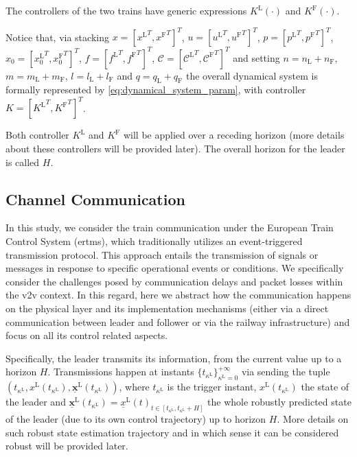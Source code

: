 \documentclass[letterpaper, 10 pt, conference]{ieeeconf}
\theoremstyle{definition}
\theoremstyle{nopoint}
\begin{document}
The controllers of the two trains have generic expressions $K^\mathrm{L}(\cdot)$ and $K^\mathrm{F}(\cdot)$.


Notice that, via stacking $x=[{x^\mathrm{L}}^T, {x^\mathrm{F}}^T]^T$, $u=[{u^\mathrm{L}}^T, {u^\mathrm{F}}^T]^T$, $p=[{p^\mathrm{L}}^T, {p^\mathrm{F}}^T]^T$, $x_0=[{x_0^\mathrm{L}}^T, {x_0^\mathrm{F}}^T]^T$, $f=[{f^\mathrm{L}}^T, {f^\mathrm{F}}^T]^T$, $\mathcal{C}=[{\mathcal{C^\mathrm{L}}}^T, {\mathcal{C^\mathrm{F}}}^T]^T$ and setting $n=n_\mathrm{L}+n_\mathrm{F}$, $m=m_\mathrm{L}+m_\mathrm{F}$, $l=l_\mathrm{L}+l_\mathrm{F}$ and $q=q_\mathrm{L}+q_\mathrm{F}$ the overall dynamical system is formally represented by \eqref{eq:dynamical_system_param}, with controller $K=[{K^\mathrm{L}}^T, {K^\mathrm{F}}^T]^T$. 

Both controller $K^\mathrm{L}$ and $K^\mathrm{F}$ will be applied over a receding horizon (more details about these controllers will be provided later). The overall horizon for the leader is called $H$.



%
\subsection{Channel Communication}
\label{subsec:transmissionEvent}


In this study, we consider the train communication {under} the European Train Control System (\gls{ertms}), {which traditionally} utilizes an event-triggered transmission protocol. This approach entails the transmission of signals or messages in response to specific operational events or conditions. We specifically consider the challenges posed by communication delays and packet losses within the \gls{v2v} context.
In this regard, here we abstract how the communication happens on the physical layer and its implementation mechanisms (either via a direct communication between leader and follower or via the railway infrastructure) and focus on all its control related aspects.


Specifically, the leader transmits its information, from the current value up to a horizon \(H\). Transmissions happen at instants \(\{ t_{\kappa^\mathrm{L}} \}_{\kappa^\mathrm{L}=0}^{+\infty}\) via sending the tuple $\left ( t_{\kappa^\mathrm{L}}, x^\mathrm{L}(t_{\kappa^\mathrm{L}}),\underline{\mathbf{x}}^\mathrm{L}(t_{\kappa^\mathrm{L}})\right)$, where $t_{\kappa^\mathrm{L}}$ is the trigger instant, $x^\mathrm{L}(t_{\kappa^\mathrm{L}})$ the state of the leader and 
$\underline{\mathbf{x}}^\mathrm{L}(t_{\kappa^\mathrm{L}})=\underline{x}^\mathrm{L}(t)_{t\in [t_{\kappa^\mathrm{L}}, t_{\kappa^\mathrm{L}} + H]}$ the whole robustly predicted state of the leader (due to its own control trajectory) up to horizon $H$.
More details on  such robust state estimation trajectory and in which sense it can be considered robust will be provided later. 
\end{document}
